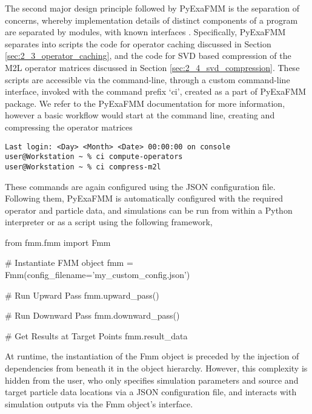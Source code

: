 The second major design principle followed by \gls{PyExaFMM} is
the separation of concerns, whereby implementation details of distinct
components of a program are separated by modules, with known interfaces
\cite{Gamma:1994:Addison}. Specifically, \gls{PyExaFMM} separates into scripts
the code for operator caching discussed in Section \ref{sec:2_3_operator_caching},
and the code for SVD based compression of the M2L operator matrices discussed in
Section \ref{sec:2_4_svd_compression}. These scripts are accessible via the
command-line, through a custom command-line interface, invoked with the command
prefix `ci', created as a part of \gls{PyExaFMM} package. We refer to the \gls{PyExaFMM} documentation for more information,
however a basic workflow would start at the command line, creating and compressing
the operator matrices

\begin{verbatim}
Last login: <Day> <Month> <Date> 00:00:00 on console
user@Workstation ~ % ci compute-operators
user@Workstation ~ % ci compress-m2l
\end{verbatim}

These commands are again configured using the \gls{JSON} configuration file.
Following them, \gls{PyExaFMM} is automatically configured with the required
operator and particle data, and simulations can be run from within a Python
interpreter or as a script using the following framework,

\begin{python}
from fmm.fmm import Fmm

# Instantiate FMM object
fmm = Fmm(config_filename='my_custom_config.json')

# Run Upward Pass
fmm.upward_pass()

# Run Downward Pass
fmm.downward_pass()

# Get Results at Target Points
fmm.result_data
\end{python}

At runtime, the instantiation of the Fmm object is preceded by the injection of
dependencies from beneath it in the object hierarchy. However, this complexity is
hidden from the user, who only specifies simulation parameters and source
and target particle data locations via a \gls{JSON} configuration file, and interacts
with simulation outputs via the Fmm object's interface.
